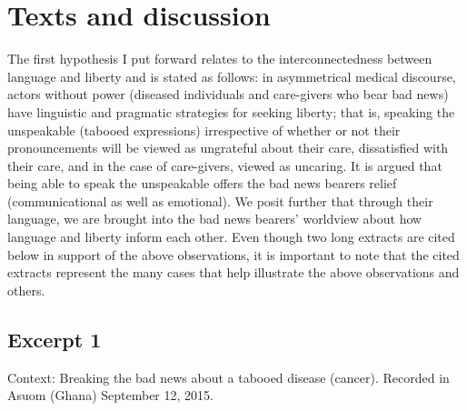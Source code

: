 \documentclass[output=paper,colorlinks,citecolor=brown]{langscibook}
\begin{document}
\section{Texts and discussion}\label{sec:obeng:4}

The first hypothesis I put forward relates to the interconnectedness between language and liberty and is stated as follows: in asymmetrical medical discourse, actors without power (diseased individuals and care-givers who bear bad news) have linguistic and pragmatic strategies for seeking liberty; that is, speaking the unspeakable (tabooed expressions) irrespective of whether or not their pronouncements will be viewed as ungrateful about their care, dissatisfied with their care, and in the case of care-givers, viewed as uncaring. It is argued that being able to speak the unspeakable offers the bad news bearers relief (communicational as well as emotional). We posit further that through their language, we are brought into the bad news bearers’ worldview about how language and liberty inform each other. Even though two long extracts are cited below in support of the above observations, it is important to note that the cited extracts represent the many cases that help illustrate the above observations and others.

\subsection{Excerpt 1}\label{sec:obeng:4.1}
Context: Breaking the bad news about a tabooed disease (cancer). Recorded in Asuom (Ghana) September 12, 2015.
\end{document}
